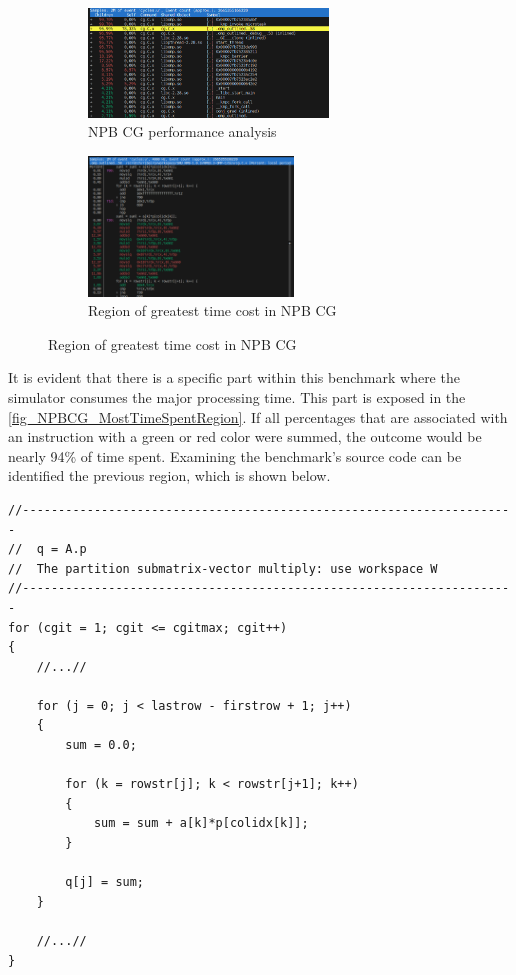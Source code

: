 \begin{figure}[H]
    \begin{subfigure}{\textwidth}
        \centering
        \includegraphics[width=0.7\textwidth]{Images/NPBCG_CycleAnalysis.png}
        \caption{ NPB CG performance analysis}
        \label{fig_NPBCG_CycleAnalysis}
    \end{subfigure}
    \begin{subfigure}{\textwidth}
        \centering
        \includegraphics[width=0.6\textwidth]{Images/NPBCG_MostTimeSpentRegion.png}
        \caption{ Region of greatest time cost in NPB CG}
        \label{fig_NPBCG_MostTimeSpentRegion}
    \end{subfigure}
\end{figure}

It is evident that there is a specific part within this benchmark where the simulator consumes the major processing time. This part is 
exposed in the \autoref{fig_NPBCG_MostTimeSpentRegion}. If all percentages that are associated with an instruction with a green or red color 
were summed, the outcome would be nearly 94\% of time spent. Examining the benchmark's source code can be identified the previous region, which is 
shown below. 


\begin{lstlisting}[style=customC, caption={Snippet source code of NPB CG}, label=CodeNpbCgSnippet]
//---------------------------------------------------------------------
//  q = A.p
//  The partition submatrix-vector multiply: use workspace W
//---------------------------------------------------------------------
for (cgit = 1; cgit <= cgitmax; cgit++) 
{
    //...//

    for (j = 0; j < lastrow - firstrow + 1; j++) 
    {
        sum = 0.0;

        for (k = rowstr[j]; k < rowstr[j+1]; k++) 
        {
            sum = sum + a[k]*p[colidx[k]];
        }

        q[j] = sum;
    }

    //...//
}
\end{lstlisting}

